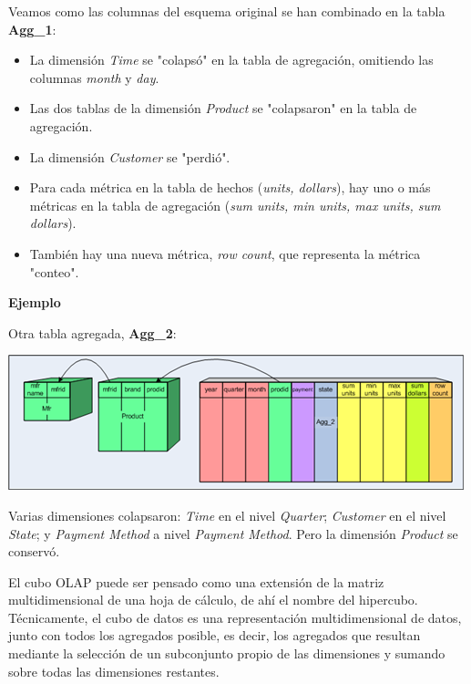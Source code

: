 \documentclass{fancyslides}
\begin{document}
\begin{frame}
\misc
{Veamos como las columnas del esquema original se han combinado en la tabla \textbf{Agg\_1}:

\begin{itemize}
  \item La dimensión \textit{Time} se "colapsó" en la tabla de agregación, omitiendo las columnas \textit{month} y \textit{day}.
  \item Las dos tablas de la dimensión \textit{Product} se "colapsaron" en la tabla de agregación.
  \item La dimensión \textit{Customer} se "perdió".
  \item Para cada métrica en la tabla de hechos (\textit{units, dollars}), hay uno o más métricas en la tabla de agregación (\textit{sum units, min units, max units, sum dollars}).
  \item También hay una nueva métrica, \textit{row count}, que representa la métrica "conteo".
\end{itemize}
}
\end{frame}


\begin{frame}
\misc
{
\textbf{Ejemplo}

Otra tabla agregada, \textbf{Agg\_2}:

\begin{center}
\includegraphics[scale=0.5]{aggregate_tables_3}
\end{center}

Varias dimensiones colapsaron: \textit{Time} en el nivel \textit{Quarter}; \textit{Customer} en el nivel \textit{State};
y \textit{Payment Method} a nivel \textit{Payment Method}. Pero la dimensión \textit{Product} se conservó.}
\end{frame}


\begin{frame}
\end{frame}

\begin{frame}
\misc
{
El cubo OLAP puede ser pensado como una extensión de la matriz multidimensional de una hoja de cálculo, de ahí el nombre del hipercubo. Técnicamente, el cubo de datos es una representación multidimensional de datos, junto con todos los agregados posible, es decir, los agregados que resultan mediante la selección de un subconjunto propio de las dimensiones y sumando sobre todas las dimensiones restantes.
}
\end{frame}
\end{document}
